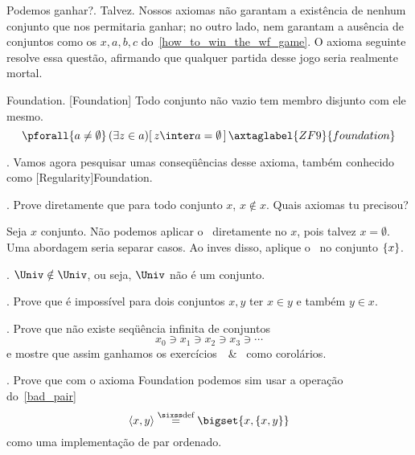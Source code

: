 \note Podemos ganhar?.
Talvez.  Nossos axiomas não garantam a existência de nenhum conjunto
que nos permitaria ganhar; no outro lado, nem garantam a ausência de
conjuntos como os $x,a,b,c$ do~\ref{how_to_win_the_wf_game}.
O axioma seguinte resolve essa questão, afirmando que qualquer partida
desse jogo seria realmente mortal.

\axiom Foundation.
[Foundation]%
\label{foundation}%
Todo conjunto não vazio tem membro disjunto com ele mesmo.
$$
\pforall {a\neq\emptyset}
\lexists {z \in a} {z\inter a = \emptyset}
\axtaglabel{ZF9}{foundation}
$$

\blah.
Vamos agora pesquisar umas conseqüências desse axioma, também conhecido como
[Regularity]{Foundation}.

\exercise.
\label{x_notin_x}%
Prove diretamente que para todo conjunto $x$, $x\notin x$.
Quais axiomas tu precisou?

\hint
Seja $x$ conjunto.
Não podemos aplicar o~ diretamente no $x$,
pois talvez $x = \emptyset$.
Uma abordagem seria separar casos.
Ao inves disso, aplique o~ no conjunto $\left\{x\right\}$.

\endexercise

\corollary.
\label{unit_not_in_univ}
$\Univ\notin\Univ$, ou seja, $\Univ$ não é um conjunto.

\exercise.
\label{x_y_cannot_belong_to_each_other}%
Prove que é impossível para dois conjuntos $x,y$ ter
$x \in y$ e também $y \in x$.

\endexercise

\exercise.
\label{no_infinite_in_descending_chain_of_sets}%
Prove que não existe seqüência infinita de conjuntos
$$
x_0 \ni x_1 \ni x_2 \ni x_3 \ni \dotsb
$$
e mostre que assim ganhamos os
exercícios~~\&~
como corolários.

\endexercise

\exercise.
\label{bad_pair_becomes_good_pair}%
Prove que com o axioma Foundation podemos sim usar a operação
do~\ref{bad_pair}
$$
\tup{x,y} \defeq \bigset{ x, \set{x, y} }
$$
como uma implementação de par ordenado.

\endexercise

\endsection

